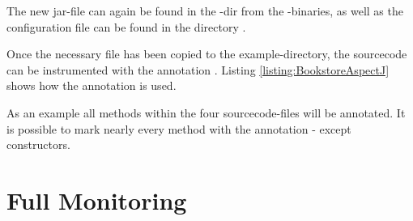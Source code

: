 The new jar-file  can again be found
in the -dir from the \Kieker{}-binaries, as well as the
configuration file \file{\aopConfigFile} can be found in the directory .

Once the necessary file has been copied to the example-directory,
the sourcecode can be instrumented with the annotation .
Listing \ref{listing:BookstoreAspectJ} shows how the annotation is
used.

\setJavaCodeListing


As an example all methods within the four sourcecode-files will be
annotated. It is possible to mark nearly every method with the annotation
- except constructors.
\section{Full Monitoring}\label{sec:aspectJ:fullweaving}
